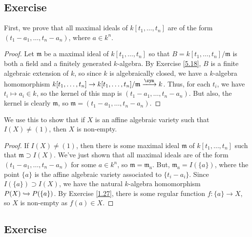 \subsection{Exercise}\label{5.19}

First, we prove that all maximal ideals of $k[t_1,\ldots,t_n]$ are of the form $(t_1-a_1,\ldots,t_n-a_n)$, where $a \in k^n$.

\begin{proof}
Let $\mathfrak{m}$ be a maximal ideal of $k[t_1,\ldots,t_n]$ so that $B = k[t_1,\ldots,t_n] / \mathfrak{m}$ is both a field and a finitely
generated $k$-algebra. By Exercise \ref{5.18}, $B$ is a finite algebraic extension of $k$, so since $k$ is algebraically closed, we have
a $k$-algebra homomorphism $k[t_1,\ldots,t_n] \to k[t_1,\ldots,t_n]/\mathfrak{m} \xlongrightarrow{\sym} k$. Thus, for each $t_i$, we have
$t_i \mapsto a_i \in k$, so the kernel of this map is $(t_1-a_1,\ldots,t_n-a_n)$. But also, the kernel is clearly $\mathfrak{m}$, so
$\mathfrak{m} = (t_1-a_1,\ldots,t_n-a_n)$.
\end{proof}

We use this to show that if $X$ is an affine algebraic variety such that $I(X) \neq (1)$, then $X$ is non-empty.

\begin{proof}
If $I(X) \neq (1)$, then there is some maximal ideal $\mathfrak{m}$ of $k[t_1,\ldots,t_n]$ such that $\mathfrak{m} \supset I(X)$. We've just
shown that all maximal ideals are of the form $(t_1 - a_1, \ldots, t_n - a_n)$ for some $a \in k^n$, so $\mathfrak{m} = \mathfrak{m}_a$. But,
$\mathfrak{m}_a = I(\{a\})$, where the point $\{a\}$ is the affine algebraic variety associated to $\{t_i - a_i\}$. Since $I(\{a\}) \supset I(X)$,
we have the natural $k$-algebra homomorphism $P(X) \xhookrightarrow{} P(\{a\})$. By Exercise \ref{1.27}, there is some regular function $f : \{a\} \to X$,
so $X$ is non-empty as $f(a) \in X$.
\end{proof}

\subsection{Exercise}\label{5.20}

